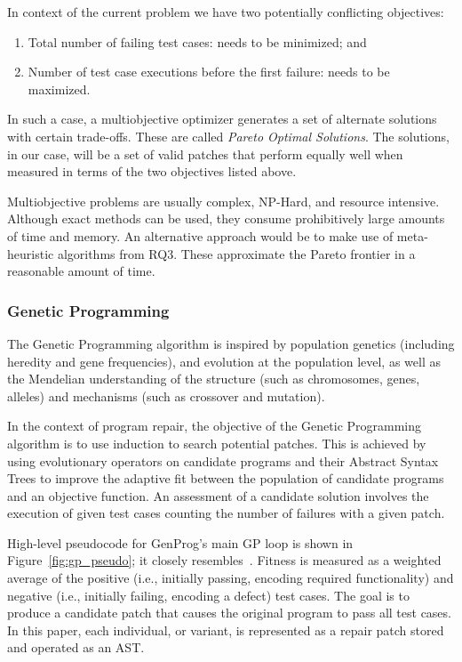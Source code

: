 \documentclass{sig-alternate}
\theoremstyle{break}
\newcommand{\be}{\begin{enumerate}}
\newcommand{\ee}{\end{enumerate}}
\newcommand{\fig}[1]{Figure~\ref{fig:#1}}
\begin{document}
In context of the current problem we have two potentially conflicting objectives: 
\be
\item Total number of failing test cases: needs to be minimized; and 
\item Number of test case executions before the first failure: needs to be maximized.
\ee




In such a case, a multiobjective optimizer generates a set of alternate solutions with certain trade-offs. These are called \textit{Pareto Optimal Solutions}. The solutions, in our case, will be a set of valid patches that perform equally well when measured in terms of the two objectives listed above.

Multiobjective problems are usually complex, NP-Hard, and resource intensive. Although exact methods can be used, they consume prohibitively large amounts of time and memory. An alternative approach would be to make use of meta-heuristic algorithms from RQ3. These approximate the Pareto frontier in a reasonable amount of time.

\subsubsection{Genetic Programming}

The Genetic Programming algorithm is inspired by population genetics (including heredity and gene frequencies), and evolution at the population level, as well as the Mendelian understanding of the structure (such as chromosomes, genes, alleles) and mechanisms (such as crossover and mutation). 

In the context of program repair, the objective of the Genetic Programming algorithm is to use induction to search potential patches. This is achieved by using evolutionary operators on candidate programs and their Abstract Syntax Trees to improve the adaptive fit between the population of candidate programs and an objective function. An assessment of a candidate solution involves the execution of given test cases counting the number of failures with a given patch.

High-level pseudocode for GenProg's main GP loop is shown in \fig{gp_pseudo}; it closely resembles~\cite{Goues}. Fitness is measured as a weighted average of the positive (i.e., initially passing, encoding required functionality) and negative (i.e., initially failing, encoding a defect) test cases. The goal is to produce a candidate patch that causes the original program to pass all test cases. In this paper, each individual, or variant, is represented as a repair patch stored and operated as an AST.  
\end{document}
